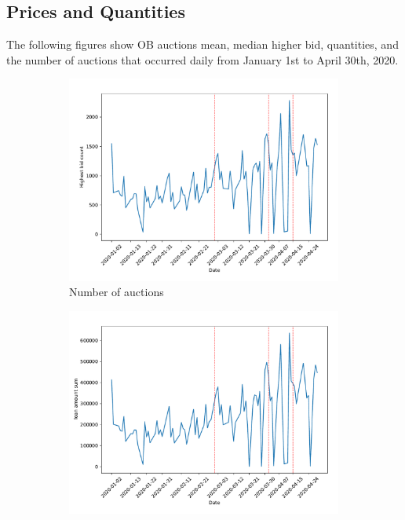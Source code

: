 \documentclass[11pt,a4paper]{article}
\begin{document}
\pagebreak
\subsection{Prices and Quantities}

The following figures show OB auctions mean, median higher bid, quantities, and the number of auctions that occurred daily from January 1st to April 30th, 2020.

\begin{figure}[h]
  \centering
  \begin{subfigure}[b]{0.49\textwidth}
      \includegraphics[width=0.998\textwidth]{../results/figures/winner_bid_count_mat30_loan1_timeseries_nr_1_7.pdf}
      \caption{ Number of auctions}
     \end{subfigure}
     \begin{subfigure}[b]{0.49\textwidth}
      \includegraphics[width=0.998\textwidth]{../results/figures/LoanAmount_sum_mat30_loan1_timeseries_nr_1_7.pdf}

\end{subfigure}
\end{figure}
\end{document}
